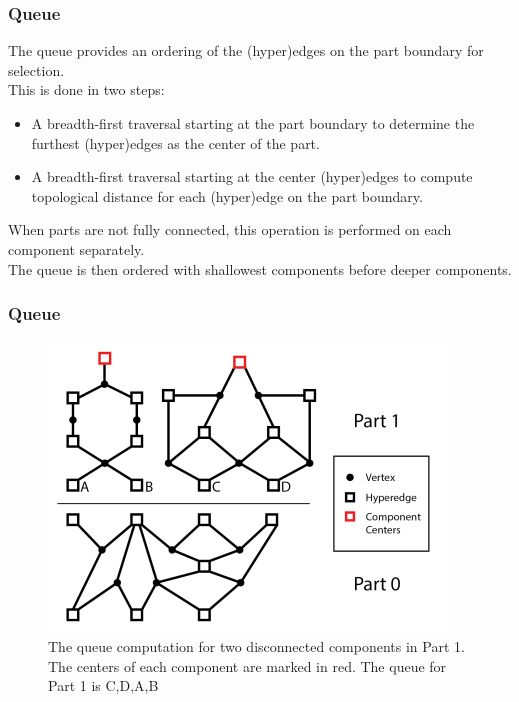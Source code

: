 \documentclass{beamer}
\begin{document}
\begin{frame}
  \frametitle{Queue}
  The queue provides an ordering of the (hyper)edges on the part boundary for selection.\\
  \medskip
  This is done in two steps:
  \begin{itemize}
  \item A breadth-first traversal starting at the part boundary to determine the furthest (hyper)edges as the center of the part.
  \item A breadth-first traversal starting at the center (hyper)edges to compute topological distance for each (hyper)edge on the part boundary.
  \end{itemize}
  When parts are not fully connected, this operation is performed on each component separately. \\
  \medskip
  The queue is then ordered with shallowest components before deeper components.
\end{frame}

\begin{frame}
  \frametitle{Queue}
  \begin{figure}
    \centering
    \includegraphics[width=.7\textwidth]{figures/Disconnected.png}
    \caption{The queue computation for two disconnected components in Part 1. The centers of each component are marked in red. The queue for Part 1 is C,D,A,B}
  \end{figure}
\end{frame}
\end{document}
